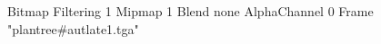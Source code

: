 {Bitmap
	{Filtering 1}
	{Mipmap 1}
	{Blend none}
	{AlphaChannel 0}
	{Frame "plantree#autlate1.tga"}
}
